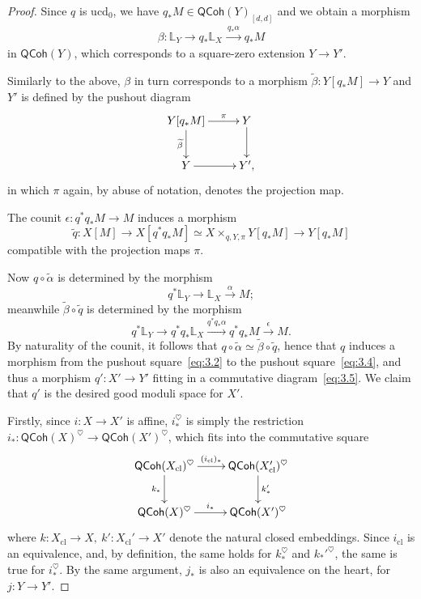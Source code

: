 \documentclass[a4paper,twoside,11pt]{amsart}
\theoremstyle{plain}
\theoremstyle{definition}
\theoremstyle{remark}
\numberwithin{equation}{section}
\newcommand{\QCoh}{\mathsf{QCoh}}
\newcommand{\cl}{\mathrm{cl}} %
\newcommand{\lr}{\longrightarrow}
\renewcommand{\tilde}{\widetilde}
\newcommand{\BL}{{\mathbb{L}}}
\begin{document}
\begin{proof}
Since $q$ is ucd$_0$, we have $q_\ast M \in \QCoh(Y)_{[d,d]}$ and we obtain a morphism
\begin{align}
    \beta \colon \BL_Y \lr q_\ast \BL_X \xrightarrow{\ q_\ast \alpha \ } q_\ast M
\end{align}
in $\QCoh(Y)$, which corresponds to a square-zero extension $Y \to Y'$.

Similarly to the above, $\beta$ in turn corresponds to a morphism $\tilde{\beta} \colon Y[q_\ast M] \to Y$ and $Y'$ is defined by the pushout diagram
\begin{align} \label{eq:3.4}
    \xymatrix{
    Y[q_\ast M] \ar[r]^-{\pi} \ar[d]_-{\tilde{\beta}} & Y \ar[d] \\
    Y \ar[r] & Y',
    }
\end{align}
in which $\pi$ again, by abuse of notation, denotes the projection map.

The counit $\epsilon \colon q^*q_*M \to M$ induces a morphism 
\[ \tilde{q} \colon X[M] \to X[q^*q_*M] \simeq X \times_{q,Y,\pi} Y[q_*M] \to Y[q_*M] \]
 compatible with the projection maps $\pi$. 
 
 Now $q \circ \tilde{\alpha}$ is determined by the morphism
 \[ q^*\BL_Y \to \BL_X \xrightarrow{\alpha} M; \]
meanwhile $\tilde{\beta}\circ \tilde{q}$ is determined by the morphism
\[ q^*\BL_Y \to q^*q_*\BL_X \xrightarrow{q^*q_* \alpha} q^*q_*M \xrightarrow{\epsilon} M. \]
By naturality of the counit, it follows that $q \circ \tilde{\alpha} \simeq \tilde{\beta} \circ \tilde{q}$, hence that $q$ induces a morphism from the pushout square~\eqref{eq:3.2} to the pushout square~\eqref{eq:3.4}, and thus a morphism $q' \colon X' \to Y'$ fitting in a commutative diagram~\eqref{eq:3.5}. We claim that $q'$ is the desired good moduli space for $X'$.

Firstly, since $i \colon X \to X'$ is affine, $i_\ast^{\heartsuit}$ is simply the restriction $i_\ast \colon \QCoh(X)^{\heartsuit} \to \QCoh(X')^{\heartsuit}$, which fits into the commutative square
\begin{align*}
    \xymatrix{
    \QCoh(X_\cl)^{\heartsuit} \ar[r]^-{(i_\cl)_\ast} \ar[d]_-{k_\ast} & \QCoh(X'_\cl)^{\heartsuit} \ar[d]^-{k'_\ast} \\
    \QCoh(X)^{\heartsuit} \ar[r]^-{i_\ast} & \QCoh(X')^{\heartsuit} }
\end{align*}
where $k \colon X_\cl \to X,\ k' \colon X_\cl' \to X'$ denote the natural closed embeddings. Since $i_\cl$ is an equivalence, and, by definition, the same holds for $k_\ast^{\heartsuit}$ and $k_\ast'^{\heartsuit}$, the same is true for $i_\ast^{\heartsuit}$. By the same argument, $j_\ast$ is also an equivalence on the heart, for $j \colon Y \to Y'$. 


\end{proof}
\end{document}
